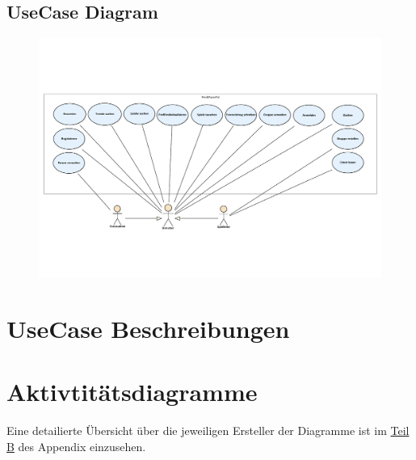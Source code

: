 \documentclass[DIV=13, 10pt,a4paper]{scrartcl}
\begin{document}
\newpage
\begin{landscape}
	\thispagestyle{empty}
	\section{UseCase Diagram}
	\begin{figure}[h!]
		\centering
		\includegraphics[width=\textheight]{docs/1_UseCaseDiagramme/PrimaryUseCases.pdf}
		\label{fig:UCD}
	\end{figure}
	\restoregeometry
\end{landscape}

\newpage
\section{UseCase Beschreibungen}





\pagebreak
\section{Aktivtitätsdiagramme}




\vfill
Eine detailierte Übersicht über die jeweiligen Ersteller der Diagramme ist im \hyperref[app:B_DiagrammUebersicht]{Teil B} des Appendix einzusehen.
\\
\\
\end{document}
